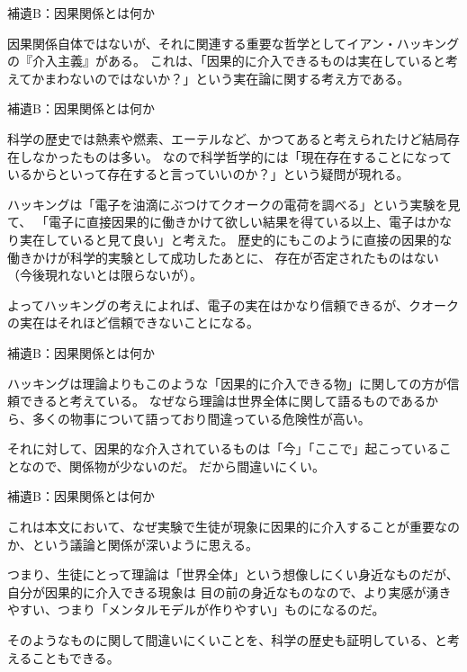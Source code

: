 \documentclass[12pt, unicode]{beamer}
\begin{document}
\begin{frame}{補遺B：因果関係とは何か}

因果関係自体ではないが、それに関連する重要な哲学としてイアン・ハッキングの『介入主義』がある。
これは、「因果的に介入できるものは実在していると考えてかまわないのではないか？」という実在論に関する考え方である。

\end{frame}

\begin{frame}{補遺B：因果関係とは何か}

科学の歴史では熱素や燃素、エーテルなど、かつてあると考えられたけど結局存在しなかったものは多い。
なので科学哲学的には「現在存在することになっているからといって存在すると言っていいのか？」という疑問が現れる。

ハッキングは「電子を油滴にぶつけてクオークの電荷を調べる」という実験を見て、
「電子に直接因果的に働きかけて欲しい結果を得ている以上、電子はかなり実在していると見て良い」と考えた。
歴史的にもこのように直接の因果的な働きかけが科学的実験として成功したあとに、
存在が否定されたものはない（今後現れないとは限らないが）。

よってハッキングの考えによれば、電子の実在はかなり信頼できるが、クオークの実在はそれほど信頼できないことになる。

\end{frame}

\begin{frame}{補遺B：因果関係とは何か}

ハッキングは理論よりもこのような「因果的に介入できる物」に関しての方が信頼できると考えている。
なぜなら理論は世界全体に関して語るものであるから、多くの物事について語っており間違っている危険性が高い。

それに対して、因果的な介入されているものは「今」「ここで」起こっていることなので、関係物が少ないのだ。
だから間違いにくい。

\end{frame}

\begin{frame}{補遺B：因果関係とは何か}

これは本文において、なぜ実験で生徒が現象に因果的に介入することが重要なのか、という議論と関係が深いように思える。

つまり、生徒にとって理論は「世界全体」という想像しにくい身近なものだが、自分が因果的に介入できる現象は
目の前の身近なものなので、より実感が湧きやすい、つまり「メンタルモデルが作りやすい」ものになるのだ。

そのようなものに関して間違いにくいことを、科学の歴史も証明している、と考えることもできる。

\end{frame}
\end{document}
